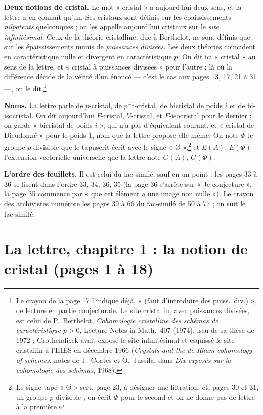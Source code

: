 \documentclass[11pt,a4paper]{article}
\begin{document}
\textbf{Deux notions de cristal.} Le mot « cristal » a aujourd'hui deux sens,
et la lettre n'en connaît qu'un. Ses cristaux sont définis sur les
épaississements \emph{nilpotents} quelconques ; on les appelle aujourd'hui
cristaux sur le \emph{site infinitésimal}. Ceux de la théorie cristalline,
due à Berthelot, ne sont définis que sur les épaississements munis de
\emph{puissances divisées}. Les deux théories coïncident en caractéristique
nulle et divergent en caractéristique $p$. On dit ici « cristal » au sens de
la lettre, et « cristal à puissances divisées » pour l'autre ; là où la
différence décide de la vérité d'un énoncé — c'est le cas aux pages 13, 17,
21 à 31 —, on le dit.\footnote{Le crayon de la page 17 l'indique déjà,
« (faut d'introduire des puiss.\ div.) », de lecture en partie conjecturale.
Le site cristallin, avec puissances divisées, est celui de P.~Berthelot,
\emph{Cohomologie cristalline des schémas de caractéristique $p>0$}, Lecture
Notes in Math.\ 407 (1974), issu de sa thèse de 1972 ; Grothendieck avait
exposé le site infinitésimal et esquissé le site cristallin à l'IHÉS en
décembre 1966 (\emph{Crystals and the de Rham cohomology of schemes}, notes de
J.~Coates et O.~Jussila, dans \emph{Dix exposés sur la cohomologie des
schémas}, 1968).}

\textbf{Noms.} La lettre parle de $p$-cristal, de $p^{-1}$-cristal, de
bicristal de poids $i$ et de bi-isocristal. On dit aujourd'hui
$F$-cristal, $V$-cristal, et $F$-isocristal pour le dernier ; on garde
« bicristal de poids $i$ », qui n'a pas d'équivalent courant, et « cristal de
Dieudonné » pour le poids 1, nom que la lettre propose elle-même. On note
$\Phi$ le groupe $p$-divisible que le tapuscrit écrit avec le signe
« Ø »,\footnote{Le signe tapé « Ø » sert, page 23, à désigner une filtration,
et, pages 30 et 31, un groupe $p$-divisible ; on écrit $\Phi$ pour le second et
on ne donne pas de lettre à la première.} et $E(A)$, $E(\Phi)$ l'extension
vectorielle universelle que la lettre note $G(A)$, $G(\Phi)$.

\textbf{L'ordre des feuillets.} Il est celui du fac-similé, sauf en un point :
les pages 33 à 36 se lisent dans l'ordre 33, 34, 36, 35 (la page 36 s'arrête
sur « Je conjecture », la page 35 commence par « que cet élément a une image
non nulle »). Le crayon des archivistes numérote les pages 39 à 66 du
fac-similé de 50 à 77 ; on suit le fac-similé.

\section*{La lettre, chapitre 1 : la notion de cristal (pages 1 à 18)}
\end{document}
